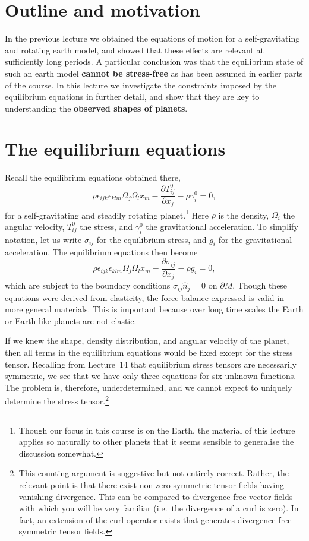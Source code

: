 \section*{Outline and motivation}
In the previous lecture we obtained the equations of motion for a self-gravitating and rotating earth model,
 and showed that these effects are relevant at sufficiently long periods. A particular conclusion was that the equilibrium 
 state of such an earth model \textbf{cannot be stress-free} as has been assumed in earlier parts of the course. 
 In this lecture we investigate the constraints imposed by the equilibrium equations in further detail, and show that they are 
 key to understanding the \textbf{observed shapes of planets}.

\section*{The equilibrium equations}
Recall the equilibrium equations obtained there,
\begin{equation}
\rho\epsilon_{ijk}\epsilon_{klm}\Omega_{j}\Omega_{l}x_{m}-\frac{\partial T_{ij}^{0}}{\partial x_{j}}-\rho\gamma_{i}^{0}=0,
\label{eq:1}
\end{equation}
for a self-gravitating and steadily rotating planet.\footnote{Though our focus in this course is on the Earth, the material of this 
lecture applies so naturally to other planets that it seems sensible to generalise the discussion somewhat.} Here $\rho$ is the 
density, $\Omega_{i}$ the angular velocity, $T_{ij}^{0}$ the stress, and $\gamma_{i}^{0}$ the gravitational acceleration. To 
simplify notation, let us write $\sigma_{ij}$ for the equilibrium stress, and $g_{i}$ for the gravitational acceleration. 
The equilibrium equations then become
\begin{equation}
\rho\epsilon_{ijk}\epsilon_{klm}\Omega_{j}\Omega_{l}x_{m}-\frac{\partial\sigma_{ij}}{\partial x_{j}}-\rho g_{i}=0,
\label{eq:2}
\end{equation}
which are subject to the boundary conditions $\sigma_{ij}\hat{n}_{j}=0$ on $\partial M$. Though these equations were 
derived from elasticity, the force balance expressed is valid in more general materials. This is important because over 
long time scales the Earth or Earth-like planets are not elastic.

If we knew the shape, density distribution, and angular velocity of the planet, then all terms in the equilibrium equations would be 
fixed except for the stress tensor. Recalling from Lecture~14 that equilibrium stress tensors are necessarily symmetric, we 
see that we have only three equations for six unknown functions. The problem is, therefore, underdetermined, and we cannot expect 
to uniquely determine the stress tensor.\footnote{This counting argument is suggestive but not entirely correct. Rather, the relevant 
point is that there exist non-zero symmetric tensor fields having vanishing divergence. This can be compared to divergence-free vector 
fields with which you will be very familiar (i.e.\ the divergence of a curl is zero). In fact, an extension of the curl operator exists that generates divergence-free symmetric tensor fields.}

